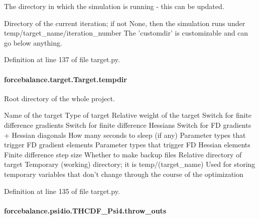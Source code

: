 The directory in which the simulation is running -\/ this can be updated. 

Directory of the current iteration; if not None, then the simulation runs under temp/target\-\_\-name/iteration\-\_\-number The 'customdir' is customizable and can go below anything.

Definition at line 137 of file target.\-py.

\hypertarget{classforcebalance_1_1target_1_1Target_aa1f01b5b78db253b5b66384ed11ed193}{
\paragraph[{tempdir}]{\setlength{\rightskip}{0pt plus 5cm}forcebalance.\-target.\-Target.\-tempdir\hspace{0.3cm}{\ttfamily [inherited]}}}\label{classforcebalance_1_1target_1_1Target_aa1f01b5b78db253b5b66384ed11ed193}


Root directory of the whole project. 

Name of the target Type of target Relative weight of the target Switch for finite difference gradients Switch for finite difference Hessians Switch for F\-D gradients + Hessian diagonals How many seconds to sleep (if any) Parameter types that trigger F\-D gradient elements Parameter types that trigger F\-D Hessian elements Finite difference step size Whether to make backup files Relative directory of target Temporary (working) directory; it is temp/(target\-\_\-name) Used for storing temporary variables that don't change through the course of the optimization 

Definition at line 135 of file target.\-py.

\hypertarget{classforcebalance_1_1psi4io_1_1THCDF__Psi4_a2325dfcc249e17fce558eaff4ed2f7f1}{
\paragraph[{throw\-\_\-outs}]{\setlength{\rightskip}{0pt plus 5cm}forcebalance.\-psi4io.\-T\-H\-C\-D\-F\-\_\-\-Psi4.\-throw\-\_\-outs}}\label{classforcebalance_1_1psi4io_1_1THCDF__Psi4_a2325dfcc249e17fce558eaff4ed2f7f1}


